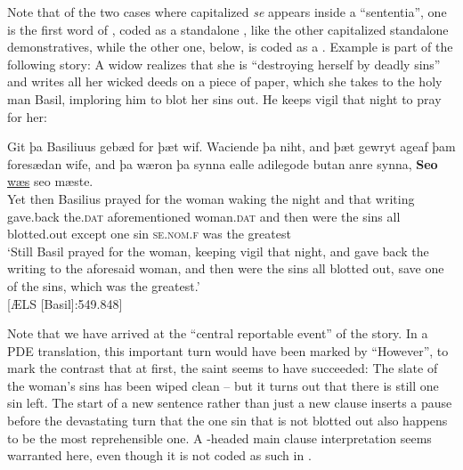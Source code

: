\documentclass[output=paper,colorlinks,citecolor=brown]{langscibook}
\begin{document}
Note that of the two cases where capitalized \textit{se} appears inside a “sententia”, one is the first word of , coded as a standalone , like the other capitalized standalone demonstratives, while the other one,  below, is coded as a . Example  is part of the following story: A widow realizes that she is “destroying herself by deadly sins” and writes all her wicked deeds on a piece of paper, which she takes to the holy man Basil, imploring him to blot her sins out. He keeps vigil that night to pray for her:

\ea\label{ex:los:28}
\gll Git þa Basiliuus gebæd for þæt wif. Waciende þa niht, and þæt gewryt ageaf þam foresædan wife, and þa wæron þa synna ealle adilegode butan anre synna, \textbf{Seo} \underline{wæs} seo mæste.\\
Yet then Basilius prayed for the woman waking the night and that writing gave.back the.\textsc{dat} aforementioned woman.\textsc{dat} and then were the sins all blotted.out except one sin \textsc{se.nom.f} was the greatest\\
\glt ‘Still Basil prayed for the woman, keeping vigil that night, and gave back the writing to the aforesaid woman, and then were the sins all blotted out, save one of the sins, which was the greatest.' \\ \hfill [ÆLS [Basil]:549.848]
\z

Note that we have arrived at the “central reportable event” \citep{Labov1972} of the story. In a PDE translation, this important turn would have been marked by “However”, to mark the contrast that at first, the saint seems to have succeeded: The slate of the woman's sins has been wiped clean – but it turns out that there is still one sin left. The start of a new sentence rather than just a new clause inserts a pause before the devastating turn that the one sin that is not blotted out also happens to be the most reprehensible one. A -headed main clause interpretation seems warranted here, even though it is not coded as such in .
\end{document}
